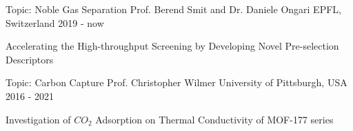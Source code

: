 
\begin{cventries}

  \cventry
    {Topic: Noble Gas Separation} %
    {Prof. Berend Smit and Dr. Daniele Ongari} %
    {EPFL, Switzerland} %
    {2019 - now} %
    {
      \begin{cvitems} %
        \item {Accelerating the High-throughput Screening by Developing Novel Pre-selection Descriptors}
      \end{cvitems}
    }

  \cventry
    {Topic: Carbon Capture} %
    {Prof. Christopher Wilmer} %
    {University of Pittsburgh, USA} %
    {2016 - 2021} %
    {
      \begin{cvitems} %
        \item {Investigation of {$CO_{2}$} Adsorption on Thermal Conductivity of MOF-177 series}
      \end{cvitems}
    }

\end{cventries}


